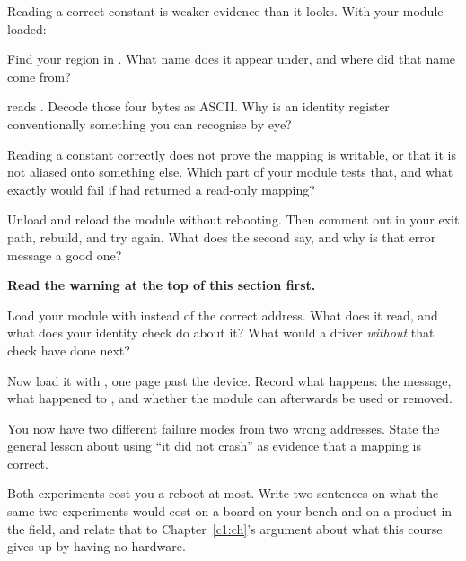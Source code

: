 \label{c6:ex:8}

Reading a correct constant is weaker evidence than it looks. With your module loaded:

 Find your region in . What name does it appear under, and where did that
name come from?

  reads . Decode those four bytes as ASCII. Why is an
identity register conventionally something you can recognise by eye?

 Reading a constant correctly does not prove the mapping is writable, or that it is not
aliased onto something else. Which part of your module tests that, and what exactly would fail if
 had returned a read-only mapping?

 Unload and reload the module without rebooting. Then comment out 
in your exit path, rebuild, and try again. What does the second  say, and why is that
error message a good one?

\label{c6:ex:9}

\textbf{Read the warning at the top of this section first.}

 Load your module with  instead of the correct address. What does it read,
and what does your identity check do about it? What would a driver \emph{without} that check have
done next?

 Now load it with , one page past the device. Record what happens: the
message, what happened to , and whether the module can afterwards be used or removed.

 You now have two different failure modes from two wrong addresses. State the general
lesson about using ``it did not crash'' as evidence that a mapping is correct.

 Both experiments cost you a reboot at most. Write two sentences on what the same two
experiments would cost on a board on your bench and on a product in the field, and relate that to
Chapter~\ref{c1:ch}'s argument about what this course gives up by having no hardware.

\label{c6:ex:10}

